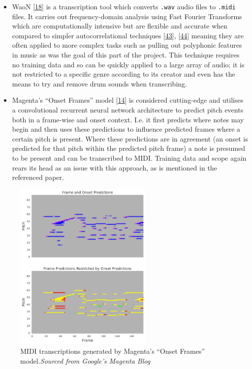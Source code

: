 \documentclass[12pt,]{article}
\providecommand{\tightlist}{%
  \setlength{\itemsep}{0pt}\setlength{\parskip}{0pt}}
\begin{document}
\begin{itemize}
\tightlist
\item
  WaoN {[}\protect\hyperlink{ref-waon}{18}{]} is a transcription tool
  which converts \texttt{.wav} audio files to \texttt{.midi} files. It
  carries out frequency-domain analysis using Fast Fourier Transforms
  which are computationally intensive but are flexible and accurate when
  compared to simpler autocorrelational techniques
  {[}\protect\hyperlink{ref-klapuri2004automatic}{43}{]},
  {[}\protect\hyperlink{ref-gerhard2003pitch}{44}{]} meaning they are
  often applied to more complex tasks such as pulling out polyphonic
  features in music as was the goal of this part of the project. This
  technique requires no training data and so can be quickly applied to a
  large array of audio; it is not restricted to a specific genre
  according to its creator and even has the means to try and remove drum
  sounds when transcribing.
\item
  Magenta's ``Onset Frames'' model
  {[}\protect\hyperlink{ref-hawthorne2017onsets}{14}{]} is considered
  cutting-edge and utilises a convolutional recurrent neural network
  architecture to predict pitch events both in a frame-wise and onset
  context. I.e. it first predicts where notes may begin and then uses
  these predictions to influence predicted frames where a certain pitch
  is present. Where these predictions are in agreement (an onset is
  predicted for that pitch within the predicted pitch frame) a note is
  presumed to be present and can be transcribed to MIDI. Training data
  and scope again rears its head as an issue with this approach, as is
  mentioned in the referenced paper.
\end{itemize}

\begin{figure}
\centering
\includegraphics[width=0.6\textwidth,height=\textheight]{Images/frames.png}
\caption{MIDI transcriptions generated by Magenta's ``Onset Frames''
model.\newline\textit{Sourced from Google's Magenta Blog}}
\end{figure}
\end{document}
